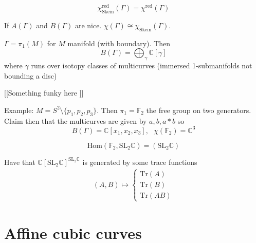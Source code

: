 \begin{theorem}
    \begin{equation}
        \chi_{\mathrm{Skein}} ^{\mathrm{red}} (\Gamma) =  \chi ^{\mathrm{red}} ( \Gamma) 
    \end{equation}
\end{theorem}

\begin{corollary}
    If $A(\Gamma) $ and $B(\Gamma)$ are nice. 
    $\chi (\Gamma) \cong \chi_{\mathrm{Skein}}(\Gamma) $. 
\end{corollary}

\begin{theorem}
    $\Gamma = \pi_1 ( M) $ for $ M $ manifold (with boundary). 
    Then 
    \begin{equation}
        B(\Gamma)  = \bigoplus_ \gamma \mathbb{C} [\gamma] 
    \end{equation}
    where $\gamma$ runs over isotopy classes of multicurves (immersed 1-submanifolds not bounding a disc) 
\end{theorem}
[[Something funky here ]] 

Example:
$M = S^2 \setminus \{ p_1, p_2, p_3 \} $. 
Then $ \pi_1 = \mathbb{F} _2 $ the free group on two generators. 
Claim then that the multicurves are given by $a, b , a*b $ so 
\begin{equation}
    B(\Gamma) = \mathbb{C} [x_1, x_2, x_3] , ~~~ \chi( \mathbb{F} _2) = \mathbb{C} ^3 
\end{equation}

\begin{equation}
    \mathrm{Hom}(\mathbb{F} _2 , \mathrm{SL}_2 \mathbb{C} ) = ( \mathrm{SL}_2 \mathbb{C} ) 
\end{equation}

Have that $ \mathbb{C} [ \mathrm{SL}_2 \mathbb{C} ] ^{\mathrm{SL}_2 \mathbb{C} } $ 
is generated by some trace functions 
\begin{align}
    (A,B) \mapsto \begin{cases}
        \mathrm{Tr} ( A)  \\
        \mathrm{Tr} ( B) \\
        \mathrm{Tr} ( AB) 
    \end{cases}
\end{align}


\section{Affine cubic curves} %

